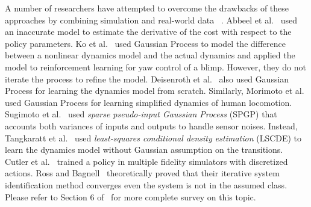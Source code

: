 A number of researchers have attempted to overcome the drawbacks of
these approaches by combining simulation and real-world data~
\cite{bib-sutton-integrated,bib-moore-prioritized-sweeping,bib-peng-incremental}.
Abbeel et al.~\cite{bib-abbeel-inaccurate} used an inaccurate model to
estimate the derivative of the cost with respect to the policy
parameters.
Ko et al.~\cite{bib-ko-blimp} used Gaussian Process to model the
difference between a nonlinear dynamics model and the actual dynamics
and applied the model to reinforcement learning for yaw control of a
blimp.  However, they do not iterate the process to refine the model.
Deisenroth et al.~\cite{bib-deisenroth-data-efficient} also used
Gaussian Process for learning the dynamics model from scratch.
Similarly, Morimoto et al.~\cite{bib-iros07-improving} used Gaussian
Process for learning simplified dynamics of human locomotion.
Sugimoto et al.~\cite{bib-humanoid13-trajectory} used
\emph{sparse pseudo-input Gaussian Process} (SPGP) that accounts both
variances of inputs and outputs to handle sensor noises.
Instead, Tangkaratt et al.~\cite{bib-nn14-model} used 
\emph{least-squares conditional density estimation} (LSCDE) to learn 
the dynamics model without Gaussian assumption on the transitions.
Cutler et al.~\cite{bib-icra14-reinforcement} trained a policy in 
multiple fidelity simulators with discretized actions.
Ross and Bagnell~\cite{bib-ross-agnostic} theoretically proved that
their iterative system identification method converges even the system
is not in the assumed class.
Please refer to Section 6 of~\cite{bib-kober-survey} for more complete
survey on this topic.

